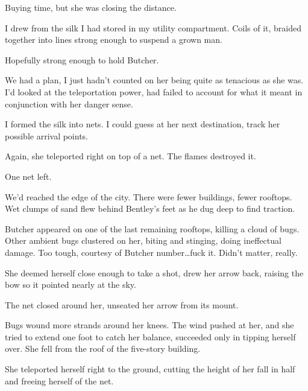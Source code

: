 Buying time, but she was closing the distance.



I drew from the silk I had stored in my utility compartment.  Coils of it, braided together into lines strong enough to suspend a grown man.



Hopefully strong enough to hold Butcher.



We had a plan, I just hadn't counted on her being quite as tenacious as she was.  I'd looked at the teleportation power, had failed to account for what it meant in conjunction with her danger sense.



I formed the silk into nets.  I could guess at her next destination, track her possible arrival points.



Again, she teleported right on top of a net.  The flames destroyed it.



One net left.



We'd reached the edge of the city.  There were fewer buildings, fewer rooftops.  Wet clumps of sand flew behind Bentley's feet as he dug deep to find traction.



Butcher appeared on one of the last remaining rooftops, killing a cloud of bugs.  Other ambient bugs clustered on her, biting and stinging, doing ineffectual damage. Too tough, courtesy of Butcher number\ldots fuck it.  Didn't matter, really.



She deemed herself close enough to take a shot, drew her arrow back, raising the bow so it pointed nearly at the sky.



The net closed around her, unseated her arrow from its mount.



Bugs wound more strands around her knees.  The wind pushed at her, and she tried to extend one foot to catch her balance, succeeded only in tipping herself over.  She fell from the roof of the five-story building.



She teleported herself right to the ground, cutting the height of her fall in half and freeing herself of the net.



